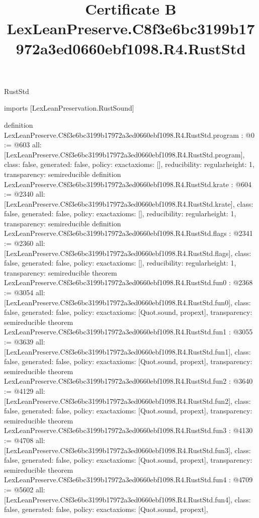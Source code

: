 \begin{lexlean}{RustStd}
\title{Certificate B LexLeanPreserve.C8f3e6bc3199b17972a3ed0660ebf1098.R4.RustStd}
\begin{coremodule}
imports [LexLeanPreservation.RustSound]

definition LexLeanPreserve.C8f3e6bc3199b17972a3ed0660ebf1098.R4.RustStd.program : @0 := @603 {
  all: [LexLeanPreserve.C8f3e6bc3199b17972a3ed0660ebf1098.R4.RustStd.program],
  class: false,
  generated: false,
  policy: exact{axioms: []},
  reducibility: regular{height: 1},
  transparency: semireducible
}
definition LexLeanPreserve.C8f3e6bc3199b17972a3ed0660ebf1098.R4.RustStd.krate : @604 := @2340 {
  all: [LexLeanPreserve.C8f3e6bc3199b17972a3ed0660ebf1098.R4.RustStd.krate],
  class: false,
  generated: false,
  policy: exact{axioms: []},
  reducibility: regular{height: 1},
  transparency: semireducible
}
definition LexLeanPreserve.C8f3e6bc3199b17972a3ed0660ebf1098.R4.RustStd.flags : @2341 := @2360 {
  all: [LexLeanPreserve.C8f3e6bc3199b17972a3ed0660ebf1098.R4.RustStd.flags],
  class: false,
  generated: false,
  policy: exact{axioms: []},
  reducibility: regular{height: 1},
  transparency: semireducible
}
theorem LexLeanPreserve.C8f3e6bc3199b17972a3ed0660ebf1098.R4.RustStd.fun0 : @2368 := @3054 {
  all: [LexLeanPreserve.C8f3e6bc3199b17972a3ed0660ebf1098.R4.RustStd.fun0],
  class: false,
  generated: false,
  policy: exact{axioms: [Quot.sound, propext]},
  transparency: semireducible
}
theorem LexLeanPreserve.C8f3e6bc3199b17972a3ed0660ebf1098.R4.RustStd.fun1 : @3055 := @3639 {
  all: [LexLeanPreserve.C8f3e6bc3199b17972a3ed0660ebf1098.R4.RustStd.fun1],
  class: false,
  generated: false,
  policy: exact{axioms: [Quot.sound, propext]},
  transparency: semireducible
}
theorem LexLeanPreserve.C8f3e6bc3199b17972a3ed0660ebf1098.R4.RustStd.fun2 : @3640 := @4129 {
  all: [LexLeanPreserve.C8f3e6bc3199b17972a3ed0660ebf1098.R4.RustStd.fun2],
  class: false,
  generated: false,
  policy: exact{axioms: [Quot.sound, propext]},
  transparency: semireducible
}
theorem LexLeanPreserve.C8f3e6bc3199b17972a3ed0660ebf1098.R4.RustStd.fun3 : @4130 := @4708 {
  all: [LexLeanPreserve.C8f3e6bc3199b17972a3ed0660ebf1098.R4.RustStd.fun3],
  class: false,
  generated: false,
  policy: exact{axioms: [Quot.sound, propext]},
  transparency: semireducible
}
theorem LexLeanPreserve.C8f3e6bc3199b17972a3ed0660ebf1098.R4.RustStd.fun4 : @4709 := @5602 {
  all: [LexLeanPreserve.C8f3e6bc3199b17972a3ed0660ebf1098.R4.RustStd.fun4],
  class: false,
  generated: false,
  policy: exact{axioms: [Quot.sound, propext]},
}
\end{coremodule}
\end{lexlean}
